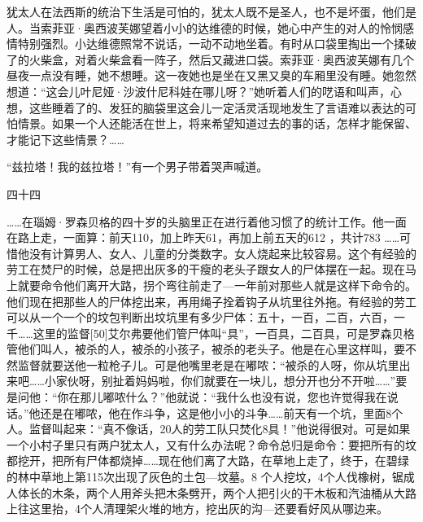 犹太人在法西斯的统治下生活是可怕的，犹太人既不是圣人，也不是坏蛋，他们是人。当索菲亚·奥西波芙娜望着小小的达维德的时候，她心中产生的对人的怜悯感情特别强烈。小达维德照常不说话，一动不动地坐着。有时从口袋里掏出一个揉破了的火柴盒，对着火柴盒看一阵子，然后又藏进口袋。索菲亚·奥西波芙娜有几个昼夜一点没有睡，她不想睡。这一夜她也是坐在又黑又臭的车厢里没有睡。她忽然想道：“这会儿叶尼娅·沙波什尼科娃在哪儿呀？”她听着人们的呓语和叫声，心想，这些睡着了的、发狂的脑袋里这会儿一定活灵活现地发生了言语难以表达的可怕情景。如果一个人还能活在世上，将来希望知道过去的事的话，怎样才能保留、才能记下这些情景？……

“兹拉塔！我的兹拉塔！”有一个男子带着哭声喊道。

四十四

……在瑙姆·罗森贝格的四十岁的头脑里正在进行着他习惯了的统计工作。他一面在路上走，一面算：前天110，加上昨天61，再加上前五天的612 ，共计783 ……可惜他没有计算男人、女人、儿童的分类数字。女人烧起来比较容易。这个有经验的劳工在焚尸的时候，总是把出灰多的干瘦的老头子跟女人的尸体摆在一起。现在马上就要命令他们离开大路，拐个弯往前走了—一年前对那些人就是这样下命令的。他们现在把那些人的尸体挖出来，再用绳子拴着钩子从坑里往外拖。有经验的劳工可以从一个一个的坟包判断出坟坑里有多少尸体：五十，一百，二百，六百，一千……这里的监督[50]艾尔弗要他们管尸体叫“具”，一百具，二百具，可是罗森贝格管他们叫人，被杀的人，被杀的小孩子，被杀的老头子。他是在心里这样叫，要不然监督就要送他一粒枪子儿。可是他嘴里老是在嘟哝：“被杀的人呀，你从坑里出来吧……小家伙呀，别扯着妈妈啦，你们就要在一块儿，想分开也分不开啦……”要是问他：“你在那儿嘟哝什么？”他就说：“我什么也没有说，您也许觉得我在说话。”他还是在嘟哝，他在作斗争，这是他小小的斗争……前天有一个坑，里面8个人。监督叫起来：“真不像话，20人的劳工队只焚化8具！”他说得很对。可是如果一个小村子里只有两户犹太人，又有什么办法呢？命令总归是命令：要把所有的坟都挖开，把所有尸体都烧掉……现在他们离了大路，在草地上走了，终于，在碧绿的林中草地上第115次出现了灰色的土包—坟墓。8 个人挖坟，4个人伐橡树，锯成人体长的木条，两个人用斧头把木条劈开，两个人把引火的干木板和汽油桶从大路上往这里抬，4个人清理架火堆的地方，挖出灰的沟—还要看好风从哪边来。

